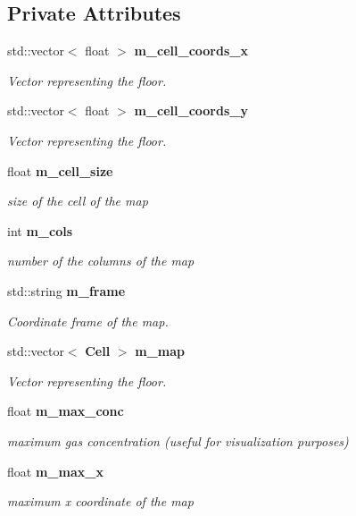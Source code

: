 \subsection*{Private Attributes}
\begin{DoxyCompactItemize}
\item 
std::vector$<$ float $>$ {\bf m\_\-cell\_\-coords\_\-x}
\begin{DoxyCompactList}\small\item\em Vector representing the floor. \end{DoxyCompactList}\item 
std::vector$<$ float $>$ {\bf m\_\-cell\_\-coords\_\-y}
\begin{DoxyCompactList}\small\item\em Vector representing the floor. \end{DoxyCompactList}\item 
float {\bf m\_\-cell\_\-size}
\begin{DoxyCompactList}\small\item\em size of the cell of the map \end{DoxyCompactList}\item 
int {\bf m\_\-cols}
\begin{DoxyCompactList}\small\item\em number of the columns of the map \end{DoxyCompactList}\item 
std::string {\bf m\_\-frame}
\begin{DoxyCompactList}\small\item\em Coordinate frame of the map. \end{DoxyCompactList}\item 
std::vector$<$ {\bf Cell} $>$ {\bf m\_\-map}
\begin{DoxyCompactList}\small\item\em Vector representing the floor. \end{DoxyCompactList}\item 
float {\bf m\_\-max\_\-conc}
\begin{DoxyCompactList}\small\item\em maximum gas concentration (useful for visualization purposes) \end{DoxyCompactList}\item 
float {\bf m\_\-max\_\-x}
\begin{DoxyCompactList}\small\item\em maximum x coordinate of the map \end{DoxyCompactList}\item 

\end{DoxyCompactItemize}
